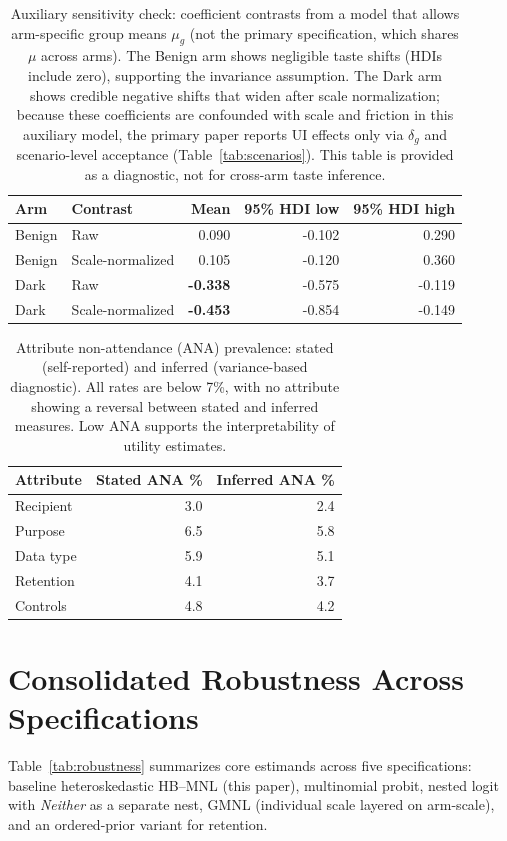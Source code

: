 \documentclass{eusset}
\newcommand{\Neither}{\textit{Neither}}
\begin{document}
\begin{table}[!h]
  \centering
  \begin{tabular}{l l r r r}
    \textbf{Arm} & \textbf{Contrast} & \textbf{Mean} & \textbf{95\% HDI low} & \textbf{95\% HDI high} \\
    \hline
    Benign & Raw              & 0.090 & -0.102 & 0.290 \\
    Benign & Scale-normalized & 0.105 & -0.120 & 0.360 \\
    Dark   & Raw              & \textbf{-0.338} & -0.575 & -0.119 \\
    Dark   & Scale-normalized & \textbf{-0.453} & -0.854 & -0.149 \\
  \end{tabular}
  \caption{Auxiliary sensitivity check: coefficient contrasts from a model that allows arm-specific group means $\mu_g$ (not the primary specification, which shares $\mu$ across arms). The Benign arm shows negligible taste shifts (HDIs include zero), supporting the invariance assumption. The Dark arm shows credible negative shifts that widen after scale normalization; because these coefficients are confounded with scale and friction in this auxiliary model, the primary paper reports UI effects only via $\delta_g$ and scenario-level acceptance (Table~\ref{tab:scenarios}). This table is provided as a diagnostic, not for cross-arm taste inference.}
  \label{tab:ui_contrasts_appendix}
\end{table}

\begin{table}[!h]
  \centering
  \begin{tabular}{l r r}
    \textbf{Attribute} & \textbf{Stated ANA \%} & \textbf{Inferred ANA \%} \\
    \hline
    Recipient & 3.0 & 2.4 \\
    Purpose   & 6.5 & 5.8 \\
    Data type & 5.9 & 5.1 \\
    Retention & 4.1 & 3.7 \\
    Controls  & 4.8 & 4.2 \\
  \end{tabular}
  \caption{Attribute non-attendance (ANA) prevalence: stated (self-reported) and inferred (variance-based diagnostic). All rates are below 7\%, with no attribute showing a reversal between stated and inferred measures. Low ANA supports the interpretability of utility estimates.}
  \label{tab:ana}  
\end{table}

\section{Consolidated Robustness Across Specifications}
Table~\ref{tab:robustness} summarizes core estimands across five specifications: baseline heteroskedastic HB--MNL (this paper), multinomial probit, nested logit with \Neither{} as a separate nest, GMNL (individual scale layered on arm-scale), and an ordered-prior variant for retention.
\end{document}
